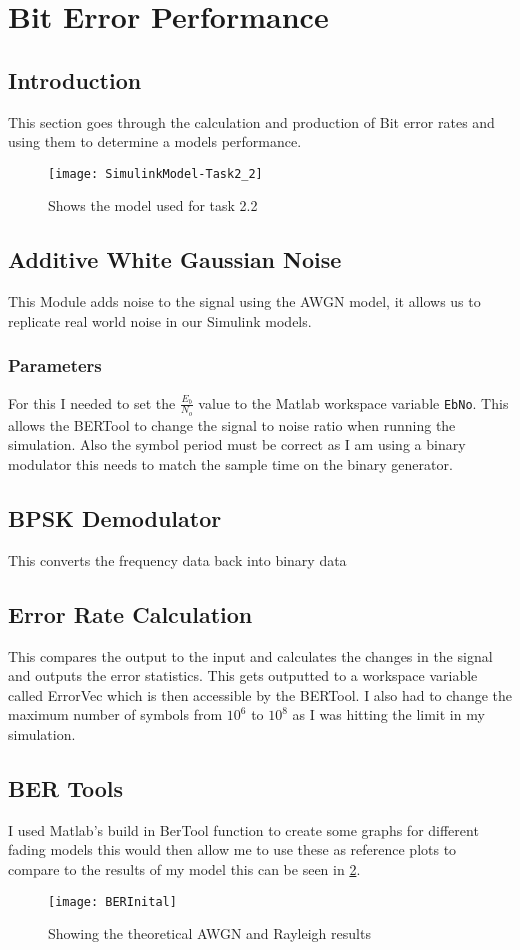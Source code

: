 \section{Bit Error Performance}{
    \subsection{Introduction}
    {
   		This section goes through the calculation and production of Bit error rates and using them to determine a models performance.
   		\begin{figure}
   			\centering
   			\texttt{[image: SimulinkModel-Task2\_2]}
   			\caption{Shows the model used for task 2.2}
   			\label{fig:2.2SimlinkModel}
   		\end{figure}
   	}
   	\subsection{Additive White Gaussian Noise}
   	{
   		This Module adds noise to the signal using the AWGN model, it allows us to replicate real world noise in our Simulink models.
   		\subsubsection{Parameters}
   		{
   			For this I needed to set the $\frac{E_b}{N_o}$ value to the Matlab workspace variable \lstinline|EbNo|. This allows the BERTool to change the signal to noise ratio when running the simulation. Also the symbol period must be correct as I am using a binary modulator this needs to match the sample time on the binary generator.
   		}
	}
	\subsection{BPSK Demodulator}
	{
		This converts the frequency data back into binary data 
	}
	\subsection{Error Rate Calculation}
	{
		This compares the output to the input and calculates the changes in the signal and outputs the error statistics. This gets outputted to a workspace variable called ErrorVec which is then accessible by the BERTool. I also had to change the maximum number of symbols from $10^6$ to $10^8$ as I was hitting the limit in my simulation.
	}
	\subsection{BER Tools}
	{
		I used Matlab's build in BerTool function to create some graphs for different fading models this would then allow me to use these as reference plots to compare to the results of my model this can be seen in \cref{fig:BerInital}.
		\begin{figure}
			\centering
			\texttt{[image: BERInital]}
			\caption{Showing the theoretical AWGN and Rayleigh results}
			\label{fig:BerInital}
		\end{figure}
	}
}
